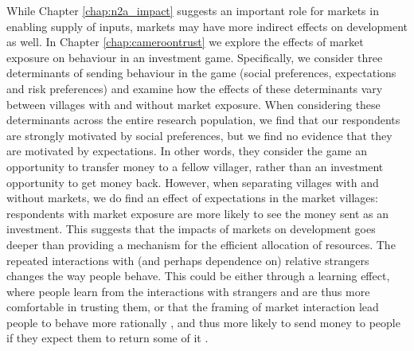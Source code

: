While Chapter \ref{chap:n2a_impact} suggests an important role for markets in enabling supply of inputs, markets may have more indirect effects on development as well. In  Chapter \ref{chap:cameroontrust} we explore the effects of market exposure on behaviour in an investment game. Specifically, we consider three determinants of sending behaviour in the game (social preferences, expectations and risk preferences) and examine how the effects of these determinants vary between villages with and without market exposure. When considering these determinants across the entire research population, we find that our respondents are strongly motivated by social preferences, but we find no evidence that they are motivated by expectations. In other words, they consider the game an opportunity to transfer money to a fellow villager, rather than an investment opportunity to get money back. However, when separating villages with and without markets, we do find an effect of expectations in the market villages: respondents with market exposure are more likely to see the money sent as an investment. This suggests that the impacts of markets on development goes deeper than providing a mechanism for the efficient allocation of resources. The repeated interactions with (and perhaps dependence on) relative strangers changes the way people behave. This could be either through a learning effect, where people learn from the interactions with strangers and are thus more comfortable in trusting them, or that the framing of market interaction lead people to behave more rationally \citep[see e.g.][]{List2008,Cecchi2013}, and thus more likely to send money to people if they expect them to return some of it .

